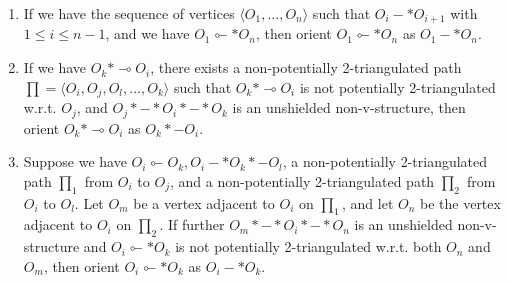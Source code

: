 \documentclass[11pt]{article}
\begin{document}
\begin{appendices}
\begin{algorithm}
\begin{algorithmic}[1]
\begin{enumerate}[nolistsep, label=(\roman*)]
    \item If we have the sequence of vertices $\langle O_1, ..., O_n \rangle$ such that $O_i -* O_{i+1}$ with $1 \le i \le n-1$, and we have $O_1 \multimapinv* O_n$, then orient $O_1 \multimapinv * O_n$ as $O_1 -* O_n$.

    \item If we have $O_k * \multimap O_i$, there exists a non-potentially 2-triangulated path $\prod = \langle O_i, O_j, O_l, ..., O_k \rangle$ such that $O_k * \multimap O_i$ is not potentially 2-triangulated w.r.t. $O_j$, and $O_j *-* O_i *-* O_k$ is an unshielded non-v-structure, then orient $O_k * \multimap O_i$ as $O_k *- O_i$.

    \item Suppose we have $O_i \multimapinv O_k, O_i -* O_k *- O_l$, a non-potentially 2-triangulated path $\prod_1$ from $O_i$ to $O_j$, and a non-potentially 2-triangulated path $\prod_2$ from $O_i$ to $O_l$. Let $O_m$ be a vertex adjacent to $O_i$ on $\prod_1$, and let $O_n$ be the vertex adjacent to $O_i$ on $\prod_2$. If further $O_m *-* O_i *-* O_n$ is an unshielded non-v-structure and $O_i \multimapinv * O_k$ is not potentially 2-triangulated w.r.t. both $O_n$ and $O_m$, then orient $O_i \multimapinv * O_k$ as $O_i -* O_k$.

    
\end{enumerate}


\end{algorithmic}
\end{algorithm}

\end{appendices}
\end{document}
